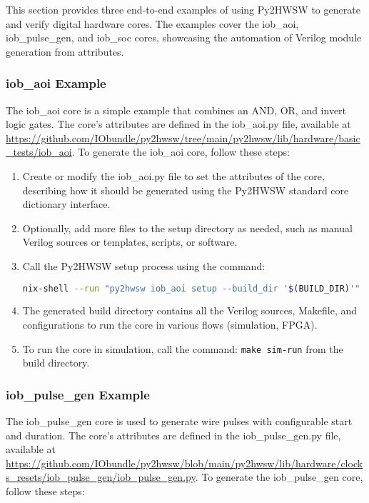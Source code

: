 %

This section provides three end-to-end examples of using Py2HWSW to generate and verify digital hardware cores. The examples cover the iob\_aoi, iob\_pulse\_gen, and iob\_soc cores, showcasing the automation of Verilog module generation from attributes.

\subsubsection{iob\_aoi Example}

The iob\_aoi core is a simple example that combines an AND, OR, and invert logic gates. The core's attributes are defined in the iob\_aoi.py file, available at \url{https://github.com/IObundle/py2hwsw/tree/main/py2hwsw/lib/hardware/basic_tests/iob_aoi}. To generate the iob\_aoi core, follow these steps:

\begin{enumerate}
\item Create or modify the iob\_aoi.py file to set the attributes of the core, describing how it should be generated using the Py2HWSW standard core dictionary interface.
\item Optionally, add more files to the setup directory as needed, such as manual Verilog sources or templates, scripts, or software.
\item Call the Py2HWSW setup process using the command:
\begin{lstlisting}[language=bash]
nix-shell --run "py2hwsw iob_aoi setup --build_dir '$(BUILD_DIR)'"
\end{lstlisting}
\item The generated build directory contains all the Verilog sources, Makefile, and configurations to run the core in various flows (simulation, FPGA).
\item To run the core in simulation, call the command: \texttt{make sim-run} from the build directory.
\end{enumerate}

\subsubsection{iob\_pulse\_gen Example}

The iob\_pulse\_gen core is used to generate wire pulses with configurable start and duration. The core's attributes are defined in the iob\_pulse\_gen.py file, available at \url{https://github.com/IObundle/py2hwsw/blob/main/py2hwsw/lib/hardware/clocks_resets/iob_pulse_gen/iob_pulse_gen.py}. To generate the iob\_pulse\_gen core, follow these steps:

